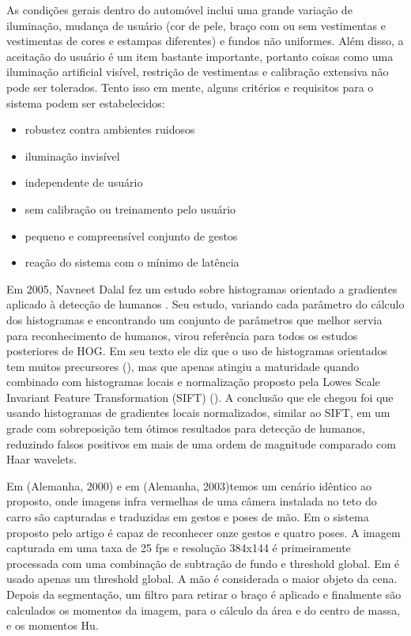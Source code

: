 As condições gerais dentro do automóvel inclui uma grande variação de iluminação, mudança de usuário (cor de pele, braço com ou sem vestimentas e vestimentas de cores e estampas diferentes) e fundos não uniformes. Além disso, a aceitação do usuário é um item bastante importante, portanto coisas como uma iluminação artificial visível, restrição de vestimentas e calibração extensiva não pode ser tolerados. Tento isso em mente, alguns critérios e requisitos para o sistema podem ser estabelecidos:

\begin{itemize}
\item robustez contra ambientes ruidosos
\item iluminação invisível
\item independente de usuário
\item sem calibração ou treinamento pelo usuário
\item pequeno e compreensível conjunto de gestos
\item reação do sistema com o mínimo de latência
\end{itemize}

Em 2005, Navneet Dalal fez um estudo sobre histogramas orientado a gradientes aplicado à detecção de humanos \cite{dalal}. Seu estudo, variando cada parâmetro do cálculo dos histogramas e encontrando um conjunto de parâmetros que melhor servia para reconhecimento de humanos, virou referência para todos os estudos posteriores de HOG. Em seu texto ele diz que o uso de histogramas orientados tem muitos precursores (), mas que apenas atingiu a maturidade quando combinado com histogramas locais e normalização proposto pela Lowes Scale Invariant Feature Transformation (SIFT) (). A conclusão que ele chegou foi que usando histogramas de gradientes locais normalizados, similar ao SIFT, em um grade com sobreposição tem ótimos resultados para detecção de humanos, reduzindo falsos positivos em mais de uma ordem de magnitude comparado com Haar wavelets.


Em \cite{ref2} (Alemanha, 2000) e em \cite{ref1} (Alemanha, 2003)temos um cenário idêntico ao proposto, onde imagens infra vermelhas de uma câmera instalada no teto do carro são capturadas e traduzidas em gestos e poses de mão. Em \cite{ref1} o sistema proposto pelo artigo é capaz de reconhecer onze gestos e quatro poses. A imagem capturada em uma taxa de 25 fps e resolução 384x144 é primeiramente processada com uma combinação de subtração de fundo e threshold global. Em \cite{ref2} é usado apenas um threshold global. A mão é considerada o maior objeto da cena. Depois da segmentação, um filtro para retirar o braço é aplicado e finalmente são calculados os momentos da imagem, para o cálculo da área e do centro de massa, e os momentos Hu.

